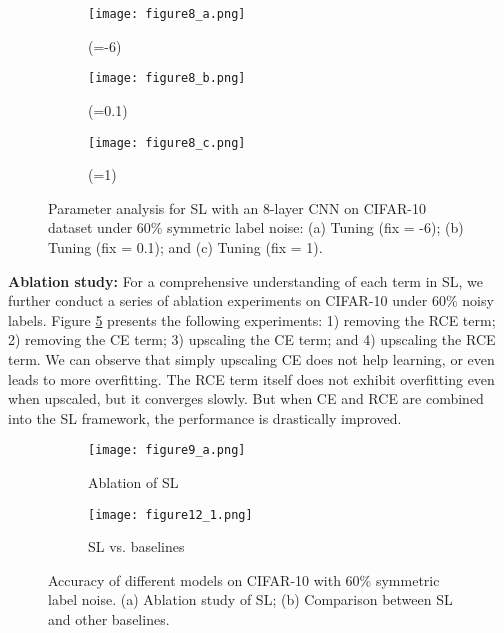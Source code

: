 \documentclass[10pt,twocolumn,letterpaper]{article}
\begin{document}
\begin{figure}[!t]
	\centering
	\begin{subfigure}{0.32\linewidth}
		\texttt{[image: figure8\_a.png]}
		\caption{ (=-6)}
		\label{sce_alpha}
	\end{subfigure}
	\begin{subfigure}{0.32\linewidth}
		\texttt{[image: figure8\_b.png]}
		\caption{ (=0.1)}
		\label{sce_A1}
	\end{subfigure}
	\begin{subfigure}{0.32\linewidth}
		\texttt{[image: figure8\_c.png]}
		\caption{ (=1)} 
		\label{sce_A2}
	\end{subfigure}
	\vspace{-0.1 in}
	\caption{Parameter analysis for SL with an 8-layer CNN on CIFAR-10 dataset under 60\% symmetric label noise: (a) Tuning  (fix  = -6); (b) Tuning  (fix  = 0.1); and (c) Tuning  (fix  = 1).}
	\vspace{-0.1 in}
	\label{fig:param_analysis}
\end{figure}

\noindent\textbf{Ablation study:}
For a comprehensive understanding of each term in SL, we further conduct a series of ablation experiments on CIFAR-10 under 60\% noisy labels. Figure \ref{ablation_sce} presents the following experiments: 1) removing the RCE term; 2) removing the CE term; 3) upscaling the CE term; and 4) upscaling the RCE term. We can observe that simply upscaling CE does not help learning, or even leads to more overfitting. The RCE term itself does not exhibit overfitting even when upscaled, but it converges slowly. But when CE and RCE are combined into the SL framework, the performance is drastically improved. 

\begin{figure}[!t]
	\centering
	\begin{subfigure}{0.49\linewidth}
		\texttt{[image: figure9\_a.png]}
		\caption{Ablation of SL}
		\label{ablation_sce}
	\end{subfigure}
	\begin{subfigure}{0.49\linewidth} 
		\texttt{[image: figure12\_1.png]}
		\caption{SL vs. baselines} 
		\label{learning_curve}
	\end{subfigure}
	\vspace{-0.1 in}
	\caption{Accuracy of different models on CIFAR-10 with 60\% symmetric label noise. (a) Ablation study of SL; (b) Comparison between SL and other baselines.}
	\vspace{-0.15 in}
	\label{fig:ce_sce_rep_40_asym}
\end{figure}
\end{document}
